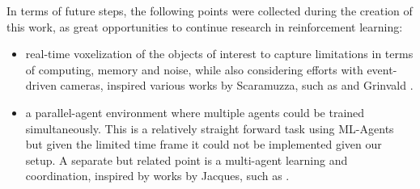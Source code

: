     
    
      
    In terms of future steps, the following points were collected during the creation of this work, as great opportunities to continue research in reinforcement learning:
    \begin{itemize}
\item real-time voxelization of the objects of interest to capture limitations in terms of computing, memory and noise, while also considering efforts with event-driven cameras, inspired various works by Scaramuzza, such as \cite{messikommer2022bridging, muglikar2021event} and Grinvald \cite{grinvald2021tsdf}.


\item a parallel-agent environment where multiple agents could be trained simultaneously. This is a relatively straight forward task using ML-Agents but given the limited time frame it could not be implemented given our setup. A separate but related point is a multi-agent learning and coordination, inspired by works by Jacques, such as \cite{ndousse2021emergent}.


  
  
    
    
        \end{itemize}

